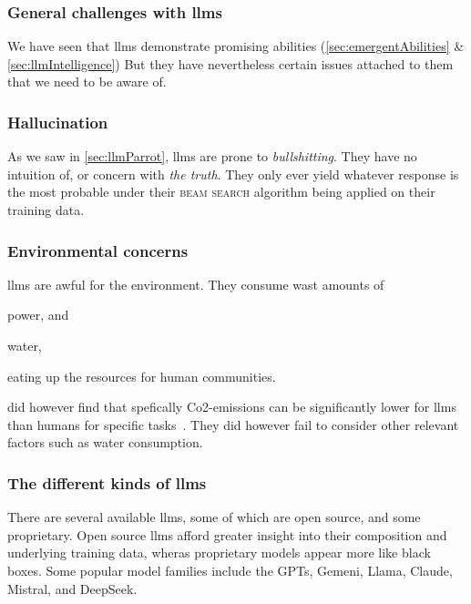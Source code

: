 \subsubsection{General challenges with \acrshort{llms}}\label{sec:llmProblems}

We have seen that \acrshort{llms} demonstrate promising abilities
(\cref{sec:emergentAbilities} \& \cref{sec:llmIntelligence}) But they have nevertheless
certain issues attached to them that we need to be aware of.

\subsubsection*{Hallucination}\label{sec:llmHallucination}

As we saw in \cref{sec:llmParrot}, \acrshort{llms} are prone to
\textit{bullshitting}. They have no intuition of, or concern with \textit{the
    truth}. They only ever yield whatever response is the most probable under their
\textsc{beam search} algorithm being applied on their training data.

\subsubsection*{Environmental concerns}

\acrshort{llms} are awful for the environment. They consume wast amounts of \begin{inparaenum}
    \item power,
    and
    \item water,
\end{inparaenum}
eating up the resources for human communities.

\citeauthor{llmCarbon} did however find that spefically Co2-emissions can be
significantly lower for \acrshort{llms} than humans for specific
tasks~\cite{llmCarbon}. They did however fail to consider other relevant factors such
as water consumption.


\subsubsection{The different kinds of \acrshort{llms}}\label{sec:llmJungle}

There are several available \acrshort{llms}, some of which are open source, and some proprietary.
Open source \acrshort{llms} afford greater insight into their composition and underlying training
data, wheras proprietary models appear more like black boxes. Some popular model families include
the GPTs, Gemeni, Llama, Claude, Mistral, and DeepSeek.


